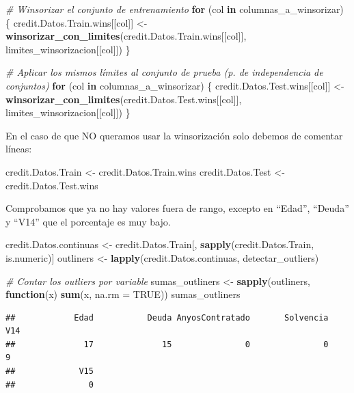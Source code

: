 \documentclass[
]{article}
\newenvironment{Shaded}{\begin{snugshade}}{\end{snugshade}}
\newcommand{\AttributeTok}[1]{\textcolor[rgb]{0.13,0.29,0.53}{#1}}
\newcommand{\CommentTok}[1]{\textcolor[rgb]{0.56,0.35,0.01}{\textit{#1}}}
\newcommand{\ConstantTok}[1]{\textcolor[rgb]{0.56,0.35,0.01}{#1}}
\newcommand{\ControlFlowTok}[1]{\textcolor[rgb]{0.13,0.29,0.53}{\textbf{#1}}}
\newcommand{\FunctionTok}[1]{\textcolor[rgb]{0.13,0.29,0.53}{\textbf{#1}}}
\newcommand{\NormalTok}[1]{#1}
\newcommand{\OtherTok}[1]{\textcolor[rgb]{0.56,0.35,0.01}{#1}}
\begin{document}
\begin{Shaded}
\begin{Highlighting}[]
\CommentTok{\# Winsorizar el conjunto de entrenamiento}
\ControlFlowTok{for}\NormalTok{ (col }\ControlFlowTok{in}\NormalTok{ columnas\_a\_winsorizar) \{}
\NormalTok{  credit.Datos.Train.wins[[col]] }\OtherTok{\textless{}{-}} \FunctionTok{winsorizar\_con\_limites}\NormalTok{(credit.Datos.Train.wins[[col]], limites\_winsorizacion[[col]])}
\NormalTok{\}}

\CommentTok{\# Aplicar los mismos límites al conjunto de prueba (p. de independencia de conjuntos)}
\ControlFlowTok{for}\NormalTok{ (col }\ControlFlowTok{in}\NormalTok{ columnas\_a\_winsorizar) \{}
\NormalTok{  credit.Datos.Test.wins[[col]] }\OtherTok{\textless{}{-}} \FunctionTok{winsorizar\_con\_limites}\NormalTok{(credit.Datos.Test.wins[[col]], limites\_winsorizacion[[col]])}
\NormalTok{\}}
\end{Highlighting}
\end{Shaded}

En el caso de que NO queramos usar la winsorización solo debemos de
comentar líneas:

\begin{Shaded}
\begin{Highlighting}[]
\NormalTok{credit.Datos.Train }\OtherTok{\textless{}{-}}\NormalTok{ credit.Datos.Train.wins}
\NormalTok{credit.Datos.Test }\OtherTok{\textless{}{-}}\NormalTok{ credit.Datos.Test.wins}
\end{Highlighting}
\end{Shaded}

Comprobamos que ya no hay valores fuera de rango, excepto en ``Edad'',
``Deuda'' y ``V14'' que el porcentaje es muy bajo.

\begin{Shaded}
\begin{Highlighting}[]
\NormalTok{credit.Datos.continuas }\OtherTok{\textless{}{-}}\NormalTok{ credit.Datos.Train[, }\FunctionTok{sapply}\NormalTok{(credit.Datos.Train, is.numeric)]}
\NormalTok{outliners }\OtherTok{\textless{}{-}} \FunctionTok{lapply}\NormalTok{(credit.Datos.continuas, detectar\_outliers)}

\CommentTok{\# Contar los outliers por variable}
\NormalTok{sumas\_outliners }\OtherTok{\textless{}{-}} \FunctionTok{sapply}\NormalTok{(outliners, }\ControlFlowTok{function}\NormalTok{(x) }\FunctionTok{sum}\NormalTok{(x, }\AttributeTok{na.rm =} \ConstantTok{TRUE}\NormalTok{))}
\NormalTok{sumas\_outliners}
\end{Highlighting}
\end{Shaded}

\begin{verbatim}
##            Edad           Deuda AnyosContratado       Solvencia             V14 
##              17              15               0               0               9 
##             V15 
##               0
\end{verbatim}
\end{document}

